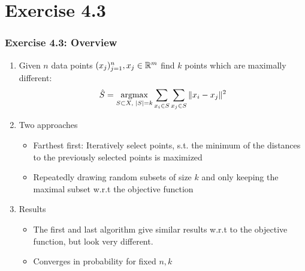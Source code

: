\documentclass[10pt,aspectratio=169,handout]{beamer}
\begin{document}
\section{Exercise 4.3}

\begin{frame}
    \frametitle{Exercise 4.3: Overview}

    \begin{enumerate}
        \item Given $n$ data points $(x_j)_{j=1}^n, x_j\in\mathbb{R}^m$ find $k$ points which are maximally different: 
        \[\hat{S}=\operatorname*{argmax}_{S\subset X,\text{ } |S|=k}\sum_{x_i\in S}\sum_{x_j\in S} \Vert x_i-x_j\Vert^2\]
        \item Two approaches
        \begin{itemize}
            \item Farthest first: Iteratively select points, s.t. the minimum of the distances to the previously selected points is maximized
            \item Repeatedly drawing random subsets of size $k$ and only keeping the maximal subset w.r.t the objective function
        \end{itemize}
        \item Results
        \begin{itemize}
            \item The first and last algorithm give similar results w.r.t to the objective function, but look very different.
            \item Converges in probability for fixed $n,k$
        \end{itemize}
    \end{enumerate}
\end{frame}
\end{document}
